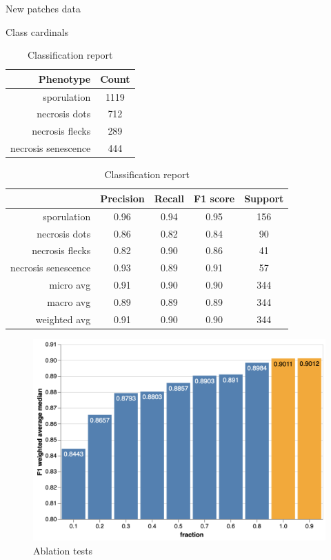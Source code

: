 \documentclass[english]{article}
\begin{document}
\begin{table}[H]
	\caption{New patches data}
	\begin{minipage}{0.4\linewidth}
		\centering
		\caption{Class cardinals}\label{tab:imprpatchersclassdistribution}
		\begin{tabular}{rc}
			\toprule
			Phenotype           & Count \\
			\midrule
			sporulation         & 1119  \\
			necrosis dots       & 712   \\
			necrosis flecks     & 289   \\
			necrosis senescence & 444   \\
			\bottomrule
		\end{tabular}
	\end{minipage}%
	\begin{minipage}{0.4\linewidth}
		\centering
		\caption{Classification report}\label{tab:imprpatches4phenotypes}
		\begin{tabular}{rcccc}
			\toprule
			{}                  & Precision & Recall & F1 score & Support \\
			\midrule
			sporulation         & 0.96      & 0.94   & 0.95     & 156     \\
			necrosis dots       & 0.86      & 0.82   & 0.84     & 90      \\
			necrosis flecks     & 0.82      & 0.90   & 0.86     & 41      \\
			necrosis senescence & 0.93      & 0.89   & 0.91     & 57      \\
			micro avg           & 0.91      & 0.90   & 0.90     & 344     \\
			macro avg           & 0.89      & 0.89   & 0.89     & 344     \\
			weighted avg        & 0.91      & 0.90   & 0.90     & 344     \\
			\bottomrule
		\end{tabular}
	\end{minipage}
\end{table}

\begin{figure}[H]
	\centering
	\includegraphics[width=0.8\linewidth]{2023_cdt_data_frac_evolution.png}
	\caption{Ablation tests}\label{fig:ablationtests}
\end{figure}
\end{document}

